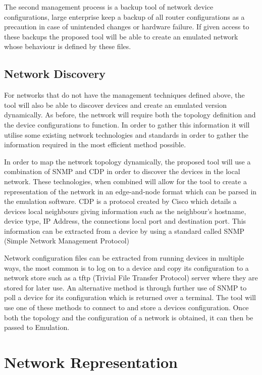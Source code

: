 \documentclass[11pt]{report}
\begin{document}
The second management process is a backup tool of network device configurations, large enterprise keep a backup of all router configurations as a precaution in case of unintended changes or hardware failure. If given access to these backups the proposed tool will be able to create an emulated network whose behaviour is defined by these files.

\subsection{Network Discovery}

For networks that do not have the management techniques defined above, the tool will also be able to discover devices and create an emulated version dynamically. As before, the network will require both the topology definition and the device configurations to function. In order to gather this information it will utilise some existing network technologies and standards in order to gather the information required in the most efficient method possible.

In order to map the network topology dynamically, the proposed tool will use a combination of SNMP and CDP in order to discover the devices in the local network. These technologies, when combined will allow for the tool to create a representation of the network in an edge-and-node format which can be parsed in the emulation software. CDP is a protocol created by Cisco which details a devices local neighbours giving information such as the neighbour's hostname, device type, IP Address, the connections local port and destination port. This information can be extracted from a device by using a standard called SNMP (Simple Network Management Protocol)

Network configuration files can be extracted from running devices in multiple ways, the most common is to log on to a device and copy its configuration to a network store such as a tftp (Trivial File Transfer Protocol) server where they are stored for later use. An alternative method is through further use of SNMP to poll a device for its configuration which is returned over a terminal. The tool will use one of these methods to connect to and store a devices configuration. Once both the topology and the configuration of a network is obtained, it can then be passed to Emulation.

\section{Network Representation}
\end{document}

